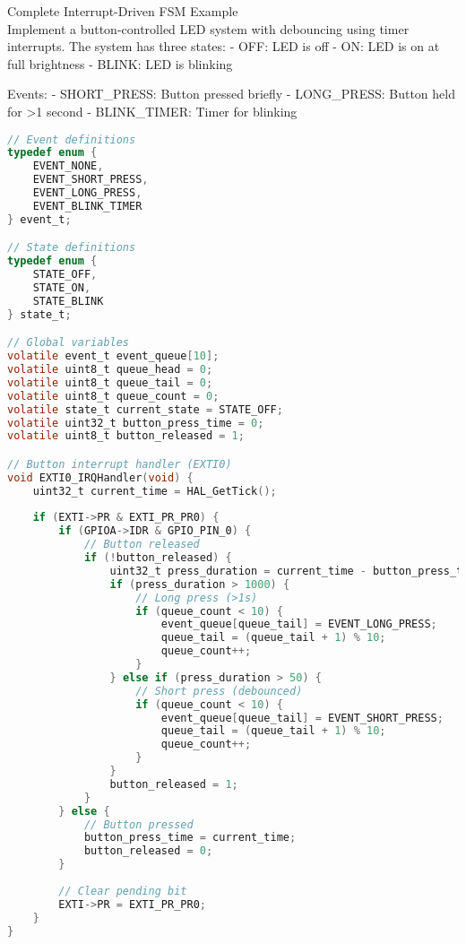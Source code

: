\begin{example2}{Complete Interrupt-Driven FSM Example}\\
Implement a button-controlled LED system with debouncing using timer interrupts.
\tcblower
The system has three states:
- OFF: LED is off
- ON: LED is on at full brightness
- BLINK: LED is blinking

Events:
- SHORT\_PRESS: Button pressed briefly
- LONG\_PRESS: Button held for >1 second
- BLINK\_TIMER: Timer for blinking

\begin{lstlisting}[language=C, style=basesmol]
// Event definitions
typedef enum {
    EVENT_NONE,
    EVENT_SHORT_PRESS,
    EVENT_LONG_PRESS,
    EVENT_BLINK_TIMER
} event_t;

// State definitions
typedef enum {
    STATE_OFF,
    STATE_ON,
    STATE_BLINK
} state_t;

// Global variables
volatile event_t event_queue[10];
volatile uint8_t queue_head = 0;
volatile uint8_t queue_tail = 0;
volatile uint8_t queue_count = 0;
volatile state_t current_state = STATE_OFF;
volatile uint32_t button_press_time = 0;
volatile uint8_t button_released = 1;

// Button interrupt handler (EXTI0)
void EXTI0_IRQHandler(void) {
    uint32_t current_time = HAL_GetTick();
    
    if (EXTI->PR & EXTI_PR_PR0) {
        if (GPIOA->IDR & GPIO_PIN_0) {
            // Button released
            if (!button_released) {
                uint32_t press_duration = current_time - button_press_time;
                if (press_duration > 1000) {
                    // Long press (>1s)
                    if (queue_count < 10) {
                        event_queue[queue_tail] = EVENT_LONG_PRESS;
                        queue_tail = (queue_tail + 1) % 10;
                        queue_count++;
                    }
                } else if (press_duration > 50) {
                    // Short press (debounced)
                    if (queue_count < 10) {
                        event_queue[queue_tail] = EVENT_SHORT_PRESS;
                        queue_tail = (queue_tail + 1) % 10;
                        queue_count++;
                    }
                }
                button_released = 1;
            }
        } else {
            // Button pressed
            button_press_time = current_time;
            button_released = 0;
        }
        
        // Clear pending bit
        EXTI->PR = EXTI_PR_PR0;
    }
}


\end{lstlisting}
\end{example2}

